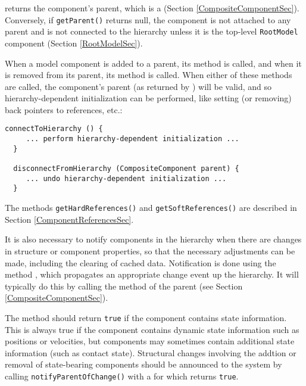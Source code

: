 \documentclass{article}
\begin{document}
returns the component's parent, which is a 
 (Section
\ref{CompositeComponentSec}). Conversely, if {\tt getParent()} returns
null, the component is not attached to any parent and is not connected
to the hierarchy unless it is the top-level {\tt RootModel} component
(Section \ref{RootModelSec}).

When a model component is added to a parent, its method
is called, and when it is removed from its parent, its method
is called.  When either of these methods are called, the component's
parent (as returned by
)
will be valid, and so hierarchy-dependent initialization can be
performed, like setting (or removing) back pointers to references,
etc.:
\begin{lstlisting}[]
  connectToHierarchy () {
     ... perform hierarchy-dependent initialization ...
  }

  disconnectFromHierarchy (CompositeComponent parent) {
     ... undo hierarchy-dependent initialization ...
  }
\end{lstlisting}

The methods {\tt getHardReferences()} and {\tt getSoftReferences()}
are described in Section \ref{ComponentReferencesSec}.
 
It is also necessary to notify components in the hierarchy when there
are changes in structure or component properties, so that the
necessary adjustments can be made, including the clearing of cached
data. Notification is done using the method
,
which propagates an appropriate change event up the hierarchy. It will
typically do this by calling the
method of the parent (see Section \ref{CompositeComponentSec}).

The method
should return {\tt true} if the component contains state
information. This is always true if the component contains dynamic
state information such as positions or velocities, but components may
sometimes contain additional state information (such as contact
state). Structural changes involving the addtion or removal of
state-bearing components should be announced to the system by calling
{\tt notifyParentOfChange()} with a
 for which
returns {\tt true}.
\end{document}

